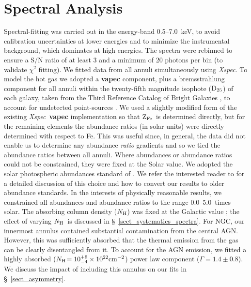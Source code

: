\documentclass{emulateapj}
\def \nh {N${\rm _H}$}
\def \nh {$N_{\rm H}$}
\def \dtwentyfive {${\rm D_{25}}$}
\newcommand{\zfe }{${\rm Z_{Fe}}$}
\newcommand{\xspec }{{\em Xspec}}
\newcommand{\thin}{\thinspace}
\begin{document}
\section{Spectral Analysis} \label{sect_spectra}
Spectral-fitting was carried out in the energy-band 0.5--7.0~keV, 
to avoid calibration uncertainties at lower energies
and to minimize the instrumental background, which dominates at high
energies. The spectra were rebinned to ensure a S/N ratio of at least
3 and a minimum of 20 photons per bin (to validate $\chi^2$ fitting).
We fitted data from all annuli simultaneously using
\xspec. To model the hot gas we adopted a {\bf vapec} component,
plus a bremsstrahlung component for all annuli within the 
twenty-fifth magnitude isophote (\dtwentyfive) of each galaxy, taken
from the Third Reference Catalog of Bright Galaxies 
\citep[RC3:][]{devaucouleurs91}, to
account for undetected point-sources \citep[this model gives a good fit to
the composite spectrum of the detected sources in nearby 
galaxies:][]{irwin03a}.
We used a slightly modified form of the existing \xspec\ {\bf vapec}
implementation so that \zfe\ is determined directly, but for the remaining
elements the abundance ratios (in solar units) were directly
determined with respect to Fe. This was useful since, in general, the data
did not enable us to determine any abundance {\em ratio} gradients and
so we tied the abundance ratios between all annuli. 
Where abundances or abundance ratios could not be constrained, 
they were fixed at the Solar value.
We adopted the solar photospheric
abundances standard of \citet{asplund04a}. We refer the interested 
reader to \citet{humphrey05a} for a detailed discussion of this 
choice and how to convert our results to older abundance
standards. In the interests of 
physically reasonable results, we constrained all abundances and
abundance ratios to the range 0.0--5.0~times solar.
 The absorbing column density (\nh) was fixed at the Galactic value
\citep{dickey90}; the effect of varying \nh\ is discussed in 
\S~\ref{sect_systematics_spectra}.
For NGC\thin 4261, our innermost annulus contained substantial
contamination from the central AGN. However, this was sufficiently
absorbed that the thermal emission from the gas can be clearly
disentangled from it. To account for the AGN emission, we fitted
a highly absorbed (\nh${\rm =10^{+6}_{-4}\times 10^{22} cm^{-2}}$)
power law component ($\Gamma=1.4\pm0.8$). We discuss the impact 
of including this annulus on our fits in \S~\ref{sect_asymmetry}.
\end{document}

